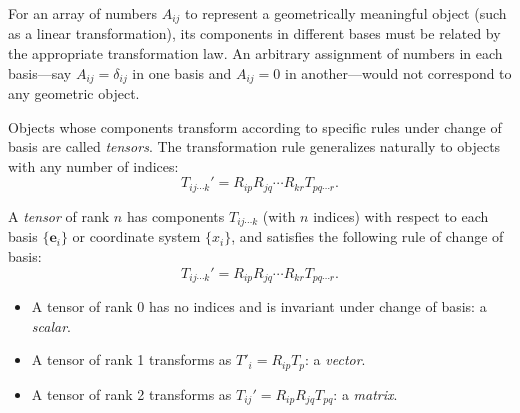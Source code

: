 \documentclass[a4paper]{article}
\begin{document}
For an array of numbers $A_{ij}$ to represent a geometrically meaningful object (such as a linear transformation), its components in different bases must be related by the appropriate transformation law. An arbitrary assignment of numbers in each basis---say $A_{ij} = \delta_{ij}$ in one basis and $A_{ij} = 0$ in another---would not correspond to any geometric object.

Objects whose components transform according to specific rules under change of basis are called \emph{tensors}. The transformation rule generalizes naturally to objects with any number of indices:
\[
  T_{ij\cdots k}' = R_{ip}R_{jq}\cdots R_{kr}T_{pq\cdots r}.
\]

\begin{defi}[Tensor]
  A \emph{tensor} of rank $n$ has components $T_{ij\cdots k}$ (with $n$ indices) with respect to each basis $\{\mathbf{e}_i\}$ or coordinate system $\{x_i\}$, and satisfies the following rule of change of basis:
  \[
    T_{ij\cdots k}' = R_{ip}R_{jq}\cdots R_{kr}T_{pq\cdots r}.
  \]
\end{defi}

\begin{eg}\leavevmode
  \begin{itemize}
    \item A tensor of rank 0 has no indices and is invariant under change of basis: a \emph{scalar}.
    \item A tensor of rank 1 transforms as $T'_i = R_{ip}T_p$: a \emph{vector}.
    \item A tensor of rank 2 transforms as $T_{ij}' = R_{ip} R_{jq} T_{pq}$: a \emph{matrix}.
  \end{itemize}
\end{eg}
\end{document}

